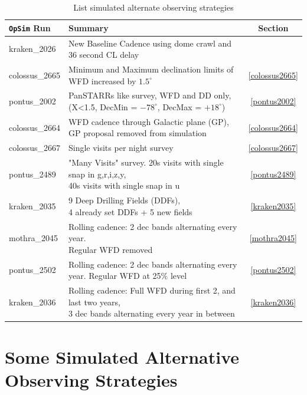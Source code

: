 \documentclass[DM,authoryear,toc]{lsstdoc}
\newcommand{\opsim}{\texttt{OpSim}\xspace}
\begin{document}
\begin{table}[htp]
\caption{List simulated alternate observing strategies}
\begin{center}
\footnotesize
\begin{tabular}{| l | l | c |}
\toprule
\opsim Run & Summary  & Section \\
\midrule
kraken\_2026      & New Baseline Cadence using dome crawl and 36 second CL delay & \\
\midrule
colossus\_2665   & Minimum and Maximum declination limits of WFD increased by $1.5^{\circ}$ & \ref{colossus2665} \\
\midrule
pontus\_2002      & PanSTARRs like survey, WFD and DD only, (X<1.5, DecMin = $-78^{\circ}$, DecMax = $+18^{\circ}$) & \ref{pontus2002}  \\
\midrule
colossus\_2664   & WFD cadence through Galactic plane (GP), GP proposal removed from simulation & \ref{colossus2664} \\
\midrule
colossus\_2667   & Single visits per night survey &  \ref{colossus2667} \\
\midrule
pontus\_2489      & \makecell{"Many Visits" survey. 20s visits with single snap in g,r,i,z,y, \\ 40s visits with single snap in u}  &  \ref{pontus2489} \\
\midrule
kraken\_2035      &\makecell{ 9 Deep Drilling Fields (DDFs), \\ 4 already set DDFs + 5 new fields} &  \ref{kraken2035} \\
\midrule
mothra\_2045      & \makecell{Rolling cadence: 2 dec bands alternating every year. \\ Regular WFD removed} & \ref {mothra2045} \\
\midrule
pontus\_2502      &  \makecell{Rolling cadence: 2 dec bands alternating every year.  \\ Regular WFD at 25$\%$ level} & \ref {pontus2502} \\
\midrule
kraken\_2036      & \makecell{ Rolling cadence: Full WFD during first 2, and last two years, \\ 3 dec bands alternating every year in between} & \ref {kraken2036} \\
\bottomrule
\end{tabular}
\end{center}
\label{tab:runlist}
\end{table}

\section{Some Simulated Alternative Observing Strategies}
\end{document}
